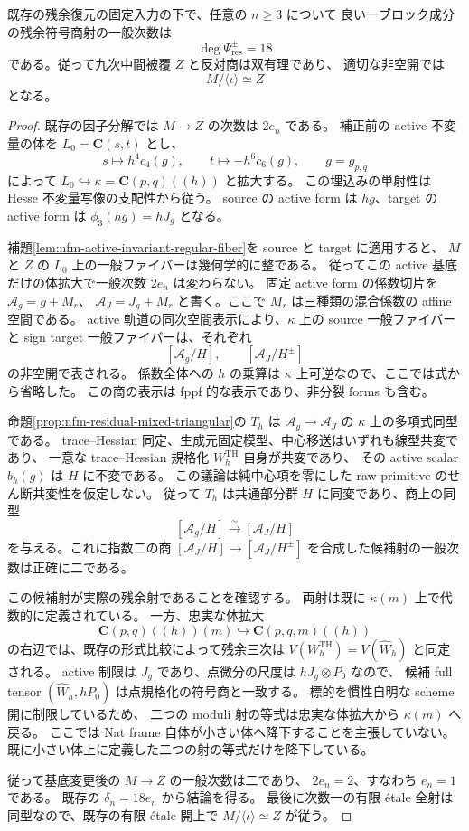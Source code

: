 \begin{theorem}[残余符号商射の正確な一般次数]
\label{thm:nfm-residual-exact-degree-eighteen}
既存の残余復元の固定入力の下で、任意の $n\ge3$ について
良い一ブロック成分の残余符号商射の一般次数は
\[
 \deg\Psi_{\mathrm{res}}^\pm=18
\]
である。従って九次中間被覆 $Z$ と反対商は双有理であり、
適切な非空開では
\[
 M/\langle\iota\rangle\simeq Z
\]
となる。
\end{theorem}

\begin{proof}
既存の因子分解では $M\to Z$ の次数は $2e_n$ である。
補正前の active 不変量の体を $L_0=\mathbf C(s,t)$ とし、
\[
 s\longmapsto h^4c_4(g),\qquad
 t\longmapsto-h^6c_6(g),\qquad
 g=g_{p,q}
\]
によって $L_0\hookrightarrow\kappa=\mathbf C(p,q)((h))$ と拡大する。
この埋込みの単射性は Hesse 不変量写像の支配性から従う。
source の active form は $hg$、target の active form は
$\phi_3(hg)=hJ_g$ となる。

補題\ref{lem:nfm-active-invariant-regular-fiber}を source と target に適用すると、
$M$ と $Z$ の $L_0$ 上の一般ファイバーは幾何学的に整である。
従ってこの active 基底だけの体拡大で一般次数 $2e_n$ は変わらない。
固定 active form の係数切片を $\mathcal A_g=g+M_r$、
$\mathcal A_J=J_g+M_r$ と書く。ここで $M_r$ は三種類の混合係数の affine 空間である。
active 軌道の同次空間表示により、$\kappa$ 上の source 一般ファイバーと
sign target 一般ファイバーは、それぞれ
\[
 [\mathcal A_g/H],\qquad[\mathcal A_J/H^\pm]
\]
の非空開で表される。
係数全体への $h$ の乗算は $\kappa$ 上可逆なので、ここでは式から省略した。
この商の表示は fppf 的な表示であり、非分裂 forms も含む。

命題\ref{prop:nfm-residual-mixed-triangular}の $T_h$ は
$\mathcal A_g\to\mathcal A_J$ の $\kappa$ 上の多項式同型である。
trace--Hessian 同定、生成元固定模型、中心移送はいずれも線型共変であり、
一意な trace--Hessian 規格化 $W_h^{\mathrm{TH}}$ 自身が共変であり、
その active scalar $b_h(g)$ は $H$ に不変である。
この議論は純中心項を零にした raw primitive のせん断共変性を仮定しない。
従って $T_h$ は共通部分群 $H$ に同変であり、商上の同型
\[
 [\mathcal A_g/H]\xrightarrow{\sim}[\mathcal A_J/H]
\]
を与える。これに指数二の商
$[\mathcal A_J/H]\to[\mathcal A_J/H^\pm]$ を合成した候補射の一般次数は正確に二である。

この候補射が実際の残余射であることを確認する。
両射は既に $\kappa(m)$ 上で代数的に定義されている。
一方、忠実な体拡大
\[
 \mathbf C(p,q)((h))(m)
   \hookrightarrow\mathbf C(p,q,m)((h))
\]
の右辺では、既存の形式比較によって残余三次は
$V(W_h^{\mathrm{TH}})=V(\widehat W_h)$ と同定される。
active 制限は $J_g$ であり、点微分の尺度は $hJ_g\otimes P_0$ なので、
候補 full tensor $(\widehat W_h,hP_0)$ は点規格化の符号商と一致する。
標的を慣性自明な scheme 開に制限しているため、
二つの moduli 射の等式は忠実な体拡大から $\kappa(m)$ へ戻る。
ここでは Nat frame 自体が小さい体へ降下することを主張していない。
既に小さい体上に定義した二つの射の等式だけを降下している。

従って基底変更後の $M\to Z$ の一般次数は二であり、
$2e_n=2$、すなわち $e_n=1$ である。
既存の $\delta_n=18e_n$ から結論を得る。
最後に次数一の有限 \'etale 全射は同型なので、既存の有限 \'etale 開上で
$M/\langle\iota\rangle\simeq Z$ が従う。
\end{proof}

